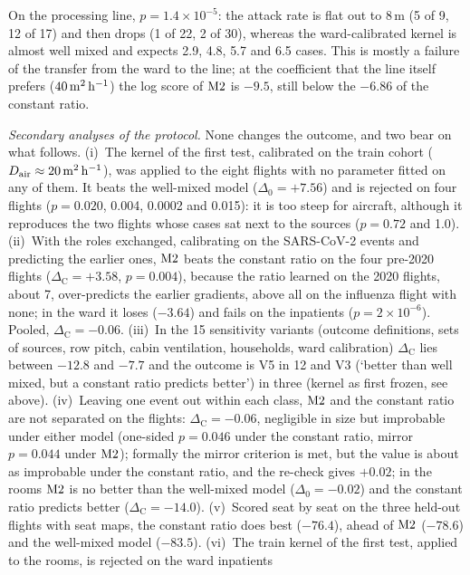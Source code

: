 On the
processing line, $p=1.4\times10^{-5}$: the attack rate is flat out to 8\,m (5 of 9, 12 of 17) and then drops (1
of 22, 2 of 30), whereas the ward-calibrated kernel is almost well mixed and expects 2.9, 4.8, 5.7 and 6.5
cases. This is mostly a failure of the transfer from the ward to the line; at the coefficient that the line
itself prefers ($40\,\mathrm{m}^2\,\mathrm{h}^{-1}$) the log score of $\mathrm{M2}$ is $-9.5$, still below the $-6.86$ of the constant ratio.

\emph{Secondary analyses of the protocol.} None changes the outcome, and two bear on what follows.
(i)~The kernel of the first test, calibrated on the train cohort ($D_{\mathrm{air}}\approx20\,\mathrm{m}^2\,\mathrm{h}^{-1}$), was applied to the
eight flights with no parameter fitted on any of them. It beats the well-mixed model ($\Delta_0=+7.56$) and is
rejected on four flights ($p=0.020$, 0.004, 0.0002 and 0.015): it is too steep for aircraft, although it
reproduces the two flights whose cases sat next to the sources ($p=0.72$ and 1.0).
(ii)~With the roles exchanged, calibrating on the SARS-CoV-2 events and predicting the earlier ones, $\mathrm{M2}$
beats the constant ratio on the four pre-2020 flights ($\Delta_{\mathrm{C}}=+3.58$, $p=0.004$), because the
ratio learned on the 2020 flights, about 7, over-predicts the earlier gradients, above all on the influenza
flight with none; in the ward it loses ($-3.64$) and fails on the inpatients ($p=2\times10^{-6}$). Pooled,
$\Delta_{\mathrm{C}}=-0.06$.
(iii)~In the 15 sensitivity variants (outcome definitions, sets of sources, row pitch, cabin ventilation,
households, ward calibration) $\Delta_{\mathrm{C}}$ lies between $-12.8$ and $-7.7$ and the outcome is V5 in 12
and V3 (`better than well mixed, but a constant ratio predicts better') in three (kernel as first frozen, see
above).
(iv)~Leaving one event out within each class, $\mathrm{M2}$ and the constant ratio are not separated on the
flights: $\Delta_{\mathrm{C}}=-0.06$, negligible in size but improbable under either model (one-sided
$p=0.046$ under the constant ratio, mirror $p=0.044$ under $\mathrm{M2}$); formally the mirror criterion is met,
but the value is about as improbable under the constant ratio, and the re-check gives $+0.02$; in the rooms $\mathrm{M2}$ is no better than the well-mixed model
($\Delta_0=-0.02$) and the constant ratio predicts better ($\Delta_{\mathrm{C}}=-14.0$).
(v)~Scored seat by seat on the three held-out flights with seat maps, the constant ratio does best ($-76.4$),
ahead of $\mathrm{M2}$ ($-78.6$) and the well-mixed model ($-83.5$).
(vi)~The train kernel of the first test, applied to the rooms, is rejected on the ward inpatients
